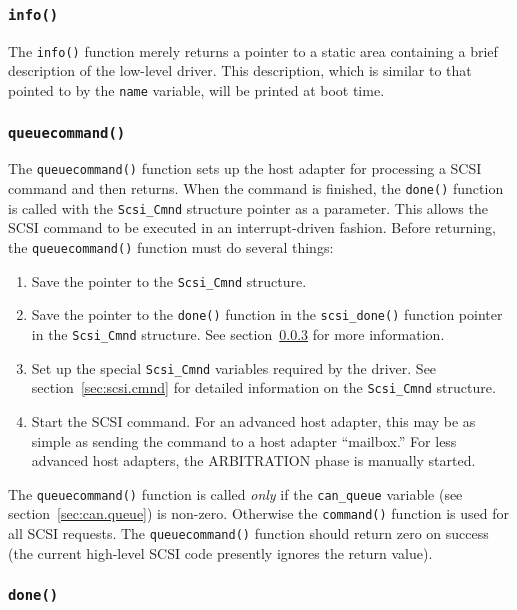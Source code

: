 \subsubsection{{\tt info()}}

The \verb|info()| function merely returns a pointer to a static area
containing a brief description of the low-level driver.  This description,
which is similar to that pointed to by the \verb|name| variable, will be
printed at boot time.



\subsubsection{{\tt queuecommand()}}
\label{sec:queuecommand}

The {\tt queuecommand()} function sets up the host adapter for processing
a SCSI command and then returns.  When the command is finished, the
\verb|done()| function is called with the \verb|Scsi_Cmnd| structure
pointer as a parameter.  This allows the SCSI command to be executed in an
interrupt-driven fashion.  Before returning, the \verb|queuecommand()|
function must do several things:
\begin{enumerate}
\item Save the pointer to the \verb|Scsi_Cmnd| structure.
\item Save the pointer to the \verb|done()| function in the
  \verb|scsi_done()| function pointer in the \verb|Scsi_Cmnd| structure.
  See section~\ref{sec:done} for more information.
\item Set up the special \verb|Scsi_Cmnd| variables required by the driver.
  See section~\ref{sec:scsi.cmnd} for detailed information on the
  \verb|Scsi_Cmnd| structure.
\item Start the SCSI command.  For an advanced host adapter, this may be as
  simple as sending the command to a host adapter ``mailbox.''  For less
  advanced host adapters, the ARBITRATION phase is manually started.
\end{enumerate}

The \verb|queuecommand()| function is called {\em only\/} if the
\verb|can_queue| variable (see section~\ref{sec:can.queue}) is non-zero.
Otherwise the \verb|command()| function is used for all SCSI requests.  The
\verb|queuecommand()| function should return zero on success (the current
high-level SCSI code presently ignores the return value).


\subsubsection{{\tt done()}}
\label{sec:done}

